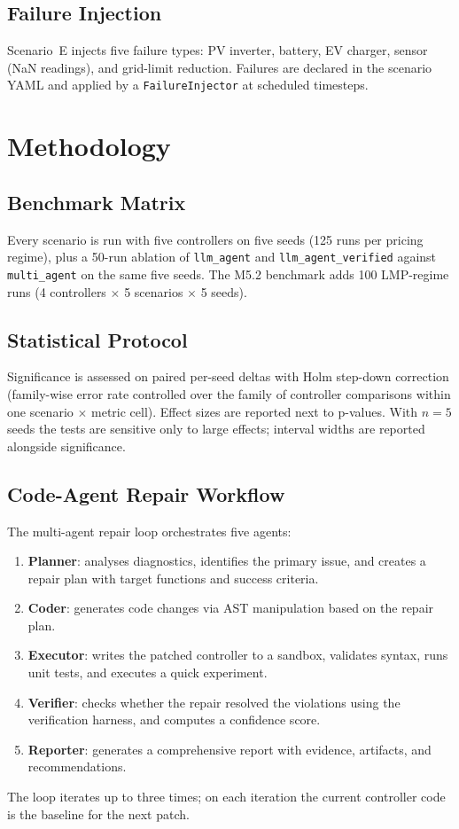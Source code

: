 \documentclass[sigconf,nonacm]{acmart}
\begin{document}
\subsection{Failure Injection}
Scenario~E injects five failure types: PV inverter, battery, EV charger,
sensor (NaN readings), and grid-limit reduction. Failures are declared in the
scenario YAML and applied by a \texttt{FailureInjector} at scheduled
timesteps.

\section{Methodology}\label{sec:method}

\subsection{Benchmark Matrix}
Every scenario is run with five controllers on five seeds (125 runs per
pricing regime), plus a 50-run ablation of \texttt{llm\_agent} and
\texttt{llm\_agent\_verified} against \texttt{multi\_agent} on the same five
seeds. The M5.2 benchmark adds 100 LMP-regime runs (4 controllers $\times$ 5
scenarios $\times$ 5 seeds).

\subsection{Statistical Protocol}
Significance is assessed on paired per-seed deltas with Holm step-down
correction (family-wise error rate controlled over the family of controller
comparisons within one scenario $\times$ metric cell). Effect sizes are
reported next to p-values. With $n=5$ seeds the tests are sensitive only to
large effects; interval widths are reported alongside significance.

\subsection{Code-Agent Repair Workflow}
The multi-agent repair loop orchestrates five agents:
\begin{enumerate}
\item \textbf{Planner}: analyses diagnostics, identifies the primary issue,
  and creates a repair plan with target functions and success criteria.
\item \textbf{Coder}: generates code changes via AST manipulation based on
  the repair plan.
\item \textbf{Executor}: writes the patched controller to a sandbox,
  validates syntax, runs unit tests, and executes a quick experiment.
\item \textbf{Verifier}: checks whether the repair resolved the violations
  using the verification harness, and computes a confidence score.
\item \textbf{Reporter}: generates a comprehensive report with evidence,
  artifacts, and recommendations.
\end{enumerate}
The loop iterates up to three times; on each iteration the current controller
code is the baseline for the next patch.
\end{document}
